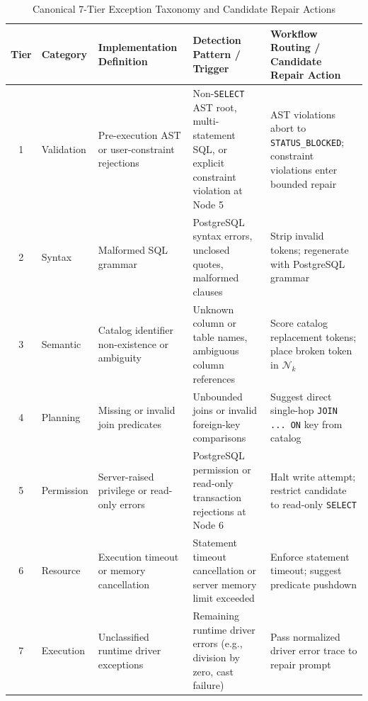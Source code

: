 \begin{table}[t]
\centering
\caption{Canonical 7-Tier Exception Taxonomy and Candidate Repair Actions}
\label{tab:taxonomy}
\footnotesize
\setlength{\tabcolsep}{4pt}
\renewcommand{\arraystretch}{1.04}
\begin{tabularx}{\textwidth}{@{}c l >{\raggedright\arraybackslash}p{3.5cm} >{\raggedright\arraybackslash}p{4.1cm} >{\raggedright\arraybackslash}X@{}}
\toprule
\textbf{Tier} & \textbf{Category} & \textbf{Implementation Definition} & \textbf{Detection Pattern / Trigger} & \textbf{Workflow Routing / Candidate Repair Action} \\
\midrule
1 & Validation & Pre-execution AST or user-constraint rejections & Non-\texttt{SELECT} AST root, multi-statement SQL, or explicit constraint violation at Node 5 & AST violations abort to \texttt{STATUS\_BLOCKED}; constraint violations enter bounded repair \\
2 & Syntax & Malformed SQL grammar & PostgreSQL syntax errors, unclosed quotes, malformed clauses & Strip invalid tokens; regenerate with PostgreSQL grammar \\
3 & Semantic & Catalog identifier non-existence or ambiguity & Unknown column or table names, ambiguous column references & Score catalog replacement tokens; place broken token in $\mathcal{N}_k$ \\
4 & Planning & Missing or invalid join predicates & Unbounded joins or invalid foreign-key comparisons & Suggest direct single-hop \texttt{JOIN ... ON} key from catalog \\
5 & Permission & Server-raised privilege or read-only errors & PostgreSQL permission or read-only transaction rejections at Node 6 & Halt write attempt; restrict candidate to read-only \texttt{SELECT} \\
6 & Resource & Execution timeout or memory cancellation & Statement timeout cancellation or server memory limit exceeded & Enforce statement timeout; suggest predicate pushdown \\
7 & Execution & Unclassified runtime driver exceptions & Remaining runtime driver errors (e.g., division by zero, cast failure) & Pass normalized driver error trace to repair prompt \\
\bottomrule
\end{tabularx}
\end{table}

